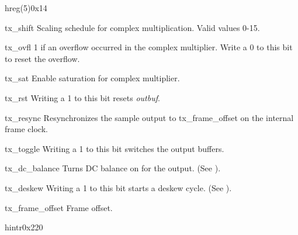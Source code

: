 \documentclass[12pt,a4paper,parskip=full,abstract=true,BCOR=12mm,twoside,open=right]{scrreprt}
\def\device#1{\textit{#1}}
\begin{document}
\begin{register}{h}{reg(5)}{0x14}%
    \label{reg5}%
    \regnewline%
    \begin{regdesc}\begin{reglist}
        \item[tx\_shift] Scaling schedule for complex multiplication. Valid values 0-15.
        \item[tx\_ovfl] 1 if an overflow occurred in the complex multiplier.
            Write a 0 to this bit to reset the overflow.
        \item[tx\_sat] Enable saturation for complex multiplier.
        \item[tx\_rst] Writing a 1 to this bit resets \device{outbuf}.
        \item[tx\_resync] Resynchronizes the sample output to
            tx\_frame\_offset on the internal frame clock.
        \item[tx\_toggle] Writing a 1 to this bit switches the output buffers.
        \item[tx\_dc\_balance] Turns DC balance on for the output. (See
            \cite{ds90cr485}).
        \item[tx\_deskew] Writing a 1 to this bit starts a deskew cycle. (See
            \cite{ds90cr485}).
        \item[tx\_frame\_offset] Frame offset.
    \end{reglist}\end{regdesc}
\end{register}
\begin{register}{h}{intr}{0x220}%
    \label{intr}%
    \regnewline%
\end{register}
\FloatBarrier %
\begingroup
\renewcommand{\cleardoublepage}{}
\renewcommand{\clearpage}{}
\end{document}
